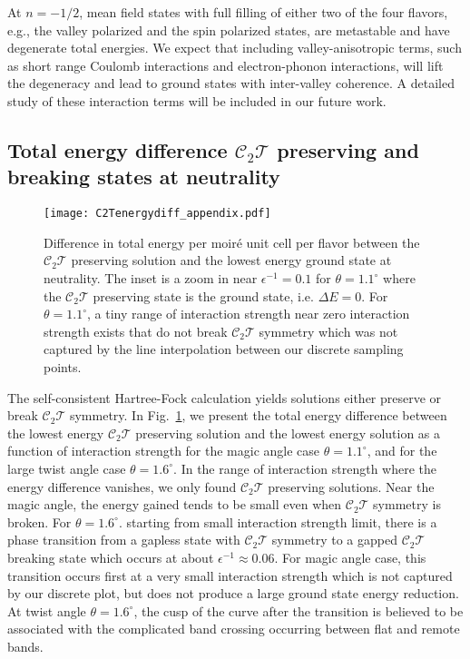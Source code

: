 \documentclass[aps,prl,reprint,amssymb,groupedaddress,twocolumn]{revtex4}
\newcommand{\CT}{$\mathcal{C}_2\mathcal{T}$ }
\begin{document}
At $n=-1/2$, mean field states with full filling of either two of the four flavors,
e.g., the valley polarized and the spin polarized states,  are metastable and have degenerate total energies.
We expect that including valley-anisotropic terms, such as short range Coulomb interactions and electron-phonon interactions,
will lift the degeneracy and lead to ground states with inter-valley coherence.
A detailed study of these interaction terms will be included in our future work.

\subsection{Total energy difference \CT preserving and breaking states at neutrality}

\begin{figure}[t!]
	\begin{center}
		\centering
		\texttt{[image: C2Tenergydiff\_appendix.pdf]}
		\caption{Difference in total energy per moir\'{e} unit cell per flavor between the \CT preserving solution and the lowest energy ground state at neutrality.
			The inset is a zoom in near $\epsilon^{-1}=0.1$ for $\theta=1.1^{\circ}$ where the \CT preserving state is the ground state, i.e. $\Delta E =0$.
		    For $\theta=1.1^{\circ}$, a tiny range of interaction strength near zero interaction strength exists that do not break \CT symmetry which was not captured
	        by the line interpolation between our discrete sampling points.}
		\label{totalenergy}
	\end{center}
\end{figure}

The self-consistent Hartree-Fock calculation yields solutions either preserve or break \CT symmetry.
In Fig.~\ref{totalenergy}, we present the total energy difference between the lowest energy \CT preserving solution 
and the lowest energy solution as a function of interaction strength for the magic angle case $\theta=1.1^{\circ}$,
and for the large twist angle case $\theta=1.6^{\circ}$.  
In the range of interaction strength where the energy difference vanishes, we only found \CT preserving solutions.
Near the magic angle, the energy gained tends to be small even when \CT symmetry is broken.
For $\theta=1.6^{\circ}$.
starting from small interaction strength limit, there is a phase transition from a gapless state with \CT symmetry to a gapped \CT breaking state
which occurs at about $\epsilon^{-1}\approx 0.06$.
For magic angle case, this transition occurs first at a very small interaction strength which is not captured by our discrete plot, but does not produce a large
ground state energy reduction.  At twist angle $\theta=1.6^{\circ}$, the cusp of the curve after the transition is believed to be associated with
the complicated band crossing occurring between flat and remote bands.
\end{document}
